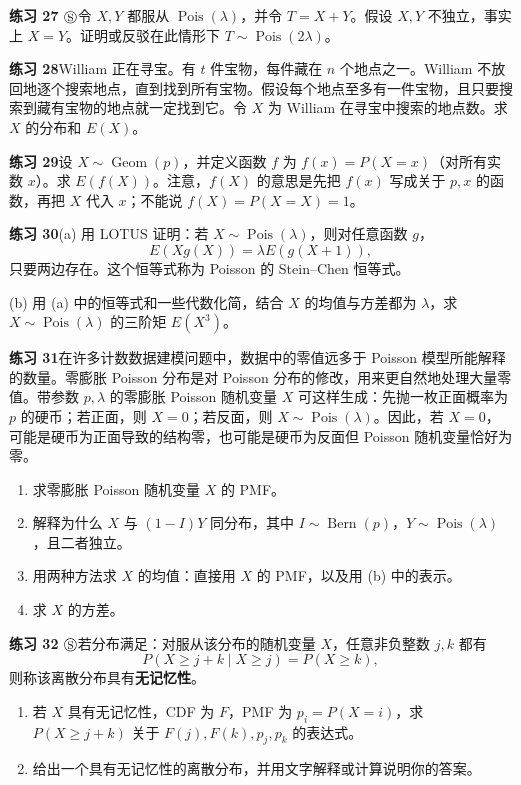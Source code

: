 \documentclass[UTF8,12pt,a4paper,fontset=fandol]{ctexart}
\begin{document}
\noindent\textbf{练习 27 $\circledS$}\quad 令 $X,Y$ 都服从 $\operatorname{Pois}(\lambda)$，并令 $T=X+Y$。假设 $X,Y$ 不独立，事实上 $X=Y$。证明或反驳在此情形下 $T\sim\operatorname{Pois}(2\lambda)$。

\noindent\textbf{练习 28}\quad William 正在寻宝。有 $t$ 件宝物，每件藏在 $n$ 个地点之一。William 不放回地逐个搜索地点，直到找到所有宝物。假设每个地点至多有一件宝物，且只要搜索到藏有宝物的地点就一定找到它。令 $X$ 为 William 在寻宝中搜索的地点数。求 $X$ 的分布和 $E(X)$。

\noindent\textbf{练习 29}\quad 设 $X\sim\operatorname{Geom}(p)$，并定义函数 $f$ 为 $f(x)=P(X=x)$（对所有实数 $x$）。求 $E(f(X))$。注意，$f(X)$ 的意思是先把 $f(x)$ 写成关于 $p,x$ 的函数，再把 $X$ 代入 $x$；不能说 $f(X)=P(X=X)=1$。

\noindent\textbf{练习 30}\quad (a) 用 LOTUS 证明：若 $X\sim\operatorname{Pois}(\lambda)$，则对任意函数 $g$，
\[
  E(Xg(X))=\lambda E(g(X+1)),
\]
只要两边存在。这个恒等式称为 Poisson 的 Stein--Chen 恒等式。

(b) 用 (a) 中的恒等式和一些代数化简，结合 $X$ 的均值与方差都为 $\lambda$，求 $X\sim\operatorname{Pois}(\lambda)$ 的三阶矩 $E(X^3)$。

\noindent\textbf{练习 31}\quad 在许多计数数据建模问题中，数据中的零值远多于 Poisson 模型所能解释的数量。零膨胀 Poisson 分布是对 Poisson 分布的修改，用来更自然地处理大量零值。带参数 $p,\lambda$ 的零膨胀 Poisson 随机变量 $X$ 可这样生成：先抛一枚正面概率为 $p$ 的硬币；若正面，则 $X=0$；若反面，则 $X\sim\operatorname{Pois}(\lambda)$。因此，若 $X=0$，可能是硬币为正面导致的结构零，也可能是硬币为反面但 Poisson 随机变量恰好为零。
\begin{enumerate}
  \item[(a)] 求零膨胀 Poisson 随机变量 $X$ 的 PMF。
  \item[(b)] 解释为什么 $X$ 与 $(1-I)Y$ 同分布，其中 $I\sim\operatorname{Bern}(p)$，$Y\sim\operatorname{Pois}(\lambda)$，且二者独立。
  \item[(c)] 用两种方法求 $X$ 的均值：直接用 $X$ 的 PMF，以及用 (b) 中的表示。
  \item[(d)] 求 $X$ 的方差。
\end{enumerate}

\noindent\textbf{练习 32 $\circledS$}\quad 若分布满足：对服从该分布的随机变量 $X$，任意非负整数 $j,k$ 都有
\[
  P(X\ge j+k\mid X\ge j)=P(X\ge k),
\]
则称该离散分布具有\textbf{无记忆性}。
\begin{enumerate}
  \item[(a)] 若 $X$ 具有无记忆性，CDF 为 $F$，PMF 为 $p_i=P(X=i)$，求 $P(X\ge j+k)$ 关于 $F(j),F(k),p_j,p_k$ 的表达式。
  \item[(b)] 给出一个具有无记忆性的离散分布，并用文字解释或计算说明你的答案。
\end{enumerate}
\end{document}
